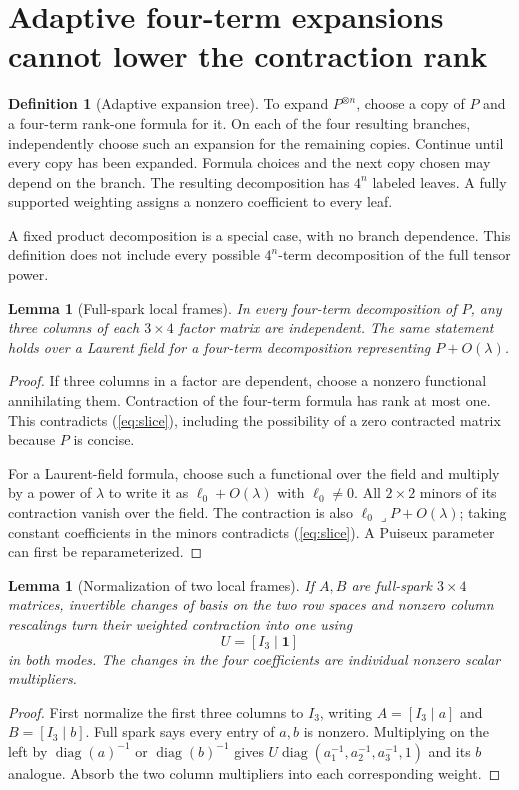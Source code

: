 \documentclass[11pt,letterpaper]{article}
\newtheorem{lemma}[theorem]{Lemma}
\theoremstyle{definition}\newtheorem{definition}[theorem]{Definition}
\theoremstyle{remark}\newtheorem{remark}[theorem]{Remark}
\DeclareMathOperator{\diag}{diag}
\newcommand{\one}{\mathbf 1}
\begin{document}
\section{Adaptive four-term expansions cannot lower the contraction rank}
\begin{definition}[Adaptive expansion tree]
To expand $P^{\otimes n}$, choose a copy of $P$ and a four-term rank-one formula for it. On each of the four resulting branches, independently choose such an expansion for the remaining copies. Continue until every copy has been expanded. Formula choices and the next copy chosen may depend on the branch. The resulting decomposition has $4^n$ labeled leaves. A fully supported weighting assigns a nonzero coefficient to every leaf.
\end{definition}
A fixed product decomposition is a special case, with no branch dependence. This definition does not include every possible $4^n$-term decomposition of the full tensor power.

\begin{lemma}[Full-spark local frames]\label{lem:spark}
In every four-term decomposition of $P$, any three columns of each $3\times4$ factor matrix are independent. The same statement holds over a Laurent field for a four-term decomposition representing $P+O(\lambda)$.
\end{lemma}
\begin{proof}
If three columns in a factor are dependent, choose a nonzero functional annihilating them. Contraction of the four-term formula has rank at most one. This contradicts (\ref{eq:slice}), including the possibility of a zero contracted matrix because $P$ is concise.

For a Laurent-field formula, choose such a functional over the field and multiply by a power of $\lambda$ to write it as $\ell_0+O(\lambda)$ with $\ell_0\ne0$. All $2\times2$ minors of its contraction vanish over the field. The contraction is also $\ell_0\mathbin{\lrcorner}P+O(\lambda)$; taking constant coefficients in the minors contradicts (\ref{eq:slice}). A Puiseux parameter can first be reparameterized.
\end{proof}

\begin{lemma}[Normalization of two local frames]\label{lem:normal}
If $A,B$ are full-spark $3\times4$ matrices, invertible changes of basis on the two row spaces and nonzero column rescalings turn their weighted contraction into one using
\[
U=[I_3\mid\one]
\]
in both modes. The changes in the four coefficients are individual nonzero scalar multipliers.
\end{lemma}
\begin{proof}
First normalize the first three columns to $I_3$, writing $A=[I_3\mid a]$ and $B=[I_3\mid b]$. Full spark says every entry of $a,b$ is nonzero. Multiplying on the left by $\diag(a)^{-1}$ or $\diag(b)^{-1}$ gives $U\diag(a_1^{-1},a_2^{-1},a_3^{-1},1)$ and its $b$ analogue. Absorb the two column multipliers into each corresponding weight.
\end{proof}
\end{document}
